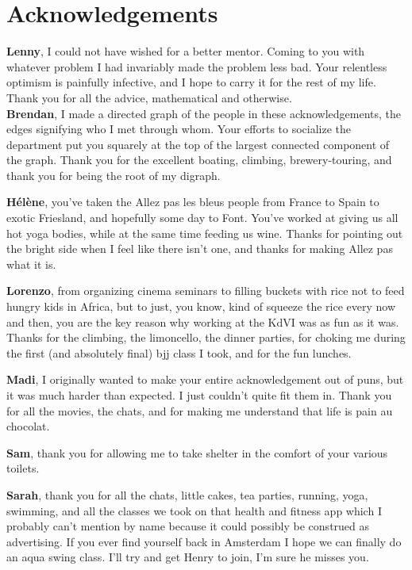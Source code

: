 \chapter*{Acknowledgements}
{\bfseries Lenny}, I could not have wished for a better mentor. Coming to you with whatever problem I had invariably made the problem less bad. Your relentless optimism is painfully infective, and I hope to carry it for the rest of my life. Thank you for all the advice, mathematical and otherwise. \\

{\bfseries Brendan}, I made a directed graph of the people in these acknowledgements, the edges signifying who I met through whom. Your efforts to socialize the department put you squarely at the top of the largest connected component of the graph. Thank you for the excellent boating, climbing, brewery-touring, and thank you for being the root of my digraph.

{\bfseries H\'el\`ene}, you've taken the Allez pas les bleus people from France to Spain to exotic Friesland, and hopefully some day to Font. You've worked at giving us all hot yoga bodies, while at the same time feeding us wine. Thanks for pointing out the bright side when I feel like there isn't one, and thanks for making Allez pas what it is.

{\bfseries Lorenzo}, from organizing cinema seminars to filling buckets with rice not to feed hungry kids in Africa, but to just, you know, kind of squeeze the rice every now and then, you are the key reason why working at the KdVI was as fun as it was. Thanks for the climbing, the limoncello, the dinner parties, for choking me during the first (and absolutely final) bjj class I took, and for the fun lunches.

{\bfseries Madi}, I originally wanted to make your entire acknowledgement out of puns, but it was much harder than expected. I just couldn't quite fit them in. Thank you for all the movies, the chats, and for making me understand that life is pain au chocolat.

{\bfseries Sam}, thank you for allowing me to take shelter in the comfort of your various toilets.

{\bfseries Sarah}, thank you for all the chats, little cakes, tea parties, running, yoga, swimming, and all the classes we took on that health and fitness app which I probably can't mention by name because it could possibly be construed as advertising. If you ever find yourself back in Amsterdam I hope we can finally do an aqua swing class. I'll try and get Henry to join, I'm sure he misses you.

